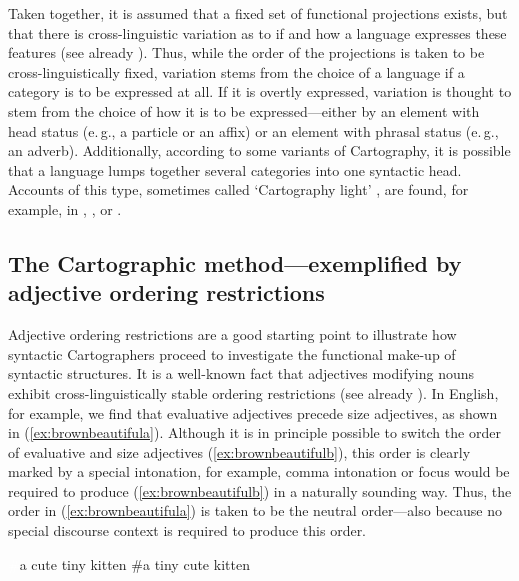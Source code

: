 Taken together, it is assumed that a fixed set of functional projections exists, but that there is cross-linguistic variation as to if and how a language expresses these features (see already \citealt{vergnaud1985dependances}). Thus, while the order of the projections is taken to be cross-linguistically fixed, variation stems from the choice of a language if a category is to be expressed at all. If it is overtly expressed, variation is thought to stem from the choice of how it is to be expressed---either by an element with head status (e.\,g., a particle or an affix) or an element with phrasal status (e.\,g., an adverb). Additionally, according to some variants of Cartography, it is possible that a language lumps together several categories into one syntactic head. Accounts of this type, sometimes called `Cartography light' \citep{van2009alternatives}, are found, for example, in \citet{rizzi1996residual}, \citet{thrainsson1996non}, or \citet{bobaljik1998two}.

\subsection{The Cartographic method---exemplified by adjective ordering restrictions}

Adjective ordering restrictions are a good starting point to illustrate how syntactic Cartographers proceed to investigate the functional make-up of syntactic structures. It is a well-known fact that adjectives modifying nouns exhibit cross-linguistically stable ordering restrictions (see already \citealt{whorf1945grammatical}). In English, for example, we find that evaluative adjectives precede size adjectives, as shown in (\ref{ex:brownbeautifula}). Although it is in principle possible to switch the order of evaluative and size adjectives (\ref{ex:brownbeautifulb}), this order is clearly marked by a special intonation, for example, comma intonation or focus would be required \citep{sproat1991cross} to produce (\ref{ex:brownbeautifulb}) in a naturally sounding way. Thus, the order in (\ref{ex:brownbeautifula}) is taken to be the neutral order---also because no special discourse context is required to produce this order.

\begin{exe}
\ex\label{brownbeautiful}\begin{xlist} 
\ex \textcolor{white}{\#}{a cute tiny kitten\label{ex:brownbeautifula} }
\ex \#{a tiny cute kitten \label{ex:brownbeautifulb}}
\end{xlist}
\end{exe}

